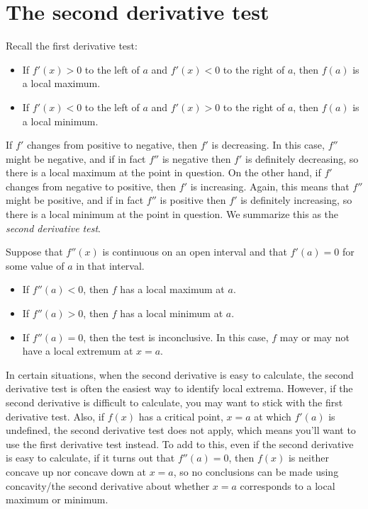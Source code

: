 \documentclass{ximera}
\begin{document}
\section{The second derivative test}


Recall the first derivative test:
\begin{itemize}
\item If $f'(x)>0$ to the left of $a$ and $f'(x)<0$ to the right of
  $a$, then $f(a)$ is a local maximum.
\item If $f'(x)<0$ to the left of $a$ and $f'(x)>0$ to the right of
  $a$, then $f(a)$ is a local minimum.
\end{itemize}

If $f'$ changes from positive to negative, then $f'$ is decreasing. In this
case, $f''$ might be negative, and if in fact $f''$ is negative
then $f'$ is definitely decreasing, so there is a local maximum at
the point in question. On the other hand, if $f'$ changes from
negative to positive, then $f'$ is increasing. Again, this means that
$f''$ might be positive, and if in fact $f''$ is positive then
$f'$ is definitely increasing, so there is a local minimum at the
point in question. We summarize this as the \textit{second derivative
  test}.

\begin{theorem}\label{T:sdt}
Suppose that $f''(x)$ is continuous on an open interval and that
$f'(a)=0$ for some value of $a$ in that interval.
\begin{itemize}
\item If $f''(a) <0$, then $f$ has a local maximum at $a$.
\item If $f''(a) >0$, then $f$ has a local minimum at $a$.
\item If $f''(a) =0$, then the test is inconclusive. In this case,
  $f$ may or may not have a local extremum at $x=a$.
\end{itemize}
\end{theorem}


In certain situations, when the second derivative is easy to calculate, the second derivative test is often the easiest way to identify local extrema.  However, if the second derivative is difficult to calculate, you may want to stick with the first derivative test.  Also, if $f(x)$ has a critical point, $x=a$ at which $f'(a)$ is undefined, the second derivative test does not apply, which means you'll want to use the first derivative test instead.  To add to this, even if the second derivative is easy to calculate, if it turns out that $f''(a) = 0$, then $f(x)$ is neither concave up nor concave down at $x=a$, so no conclusions can be made using concavity/the second derivative about whether $x=a$ corresponds to a local maximum or minimum.  
\end{document}
